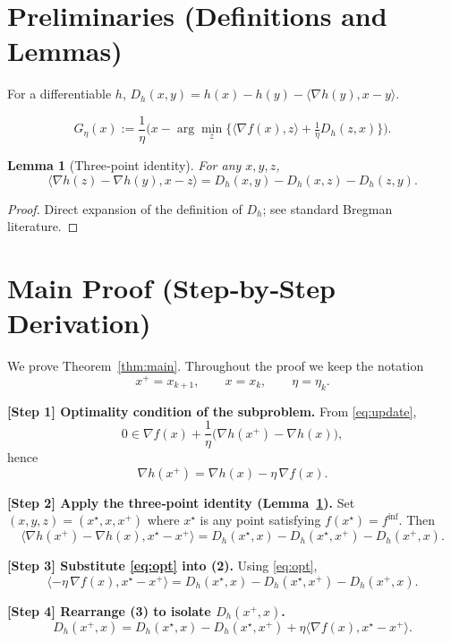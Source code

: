 \documentclass{article}
\newtheorem{lemma}{Lemma}
\newcommand{\inner}[2]{\langle #1,#2\rangle}
\begin{document}
\newpage
\section*{Preliminaries (Definitions and Lemmas)}
\begin{definition}
For a differentiable $h$, $D_{h}(x,y)=h(x)-h(y)-\inner{\nabla h(y)}{x-y}$.
\end{definition}
\begin{definition}
\[
G_{\eta}(x):=\frac{1}{\eta}\bigl(x-\arg\min_{z}\{\inner{\nabla f(x)}{z}+\tfrac{1}{\eta}D_{h}(z,x)\}\bigr).
\]
\end{definition}
\begin{lemma}[Three‑point identity]
\label{lem:3pt}
For any $x,y,z$,
\[
\inner{\nabla h(z)-\nabla h(y)}{x-z}=D_{h}(x,y)-D_{h}(x,z)-D_{h}(z,y).
\]
\end{lemma}
\begin{proof}
Direct expansion of the definition of $D_{h}$; see standard Bregman literature. \hfill\qedsymbol
\end{proof}

\section*{Main Proof (Step‑by‑Step Derivation)}
We prove Theorem~\ref{thm:main}.  Throughout the proof we keep the notation
\[
x^{+}=x_{k+1},\qquad x=x_{k},\qquad \eta=\eta_{k}.
\]

\bigskip
\noindent\textbf{[Step 1] Optimality condition of the subproblem.}  
From \eqref{eq:update},
\[
0\in \nabla f(x)+\frac{1}{\eta}\bigl(\nabla h(x^{+})-\nabla h(x)\bigr),
\]
hence
\begin{equation}
\label{eq:opt}
\nabla h(x^{+})=\nabla h(x)-\eta\,\nabla f(x).
\end{equation}

\noindent\textbf{[Step 2] Apply the three‑point identity (Lemma~\ref{lem:3pt}).}  
Set $(x,y,z)=(x^{\star},x,x^{+})$ where $x^{\star}$ is any point satisfying $f(x^{\star})=f^{\inf}$. Then
\[
\inner{\nabla h(x^{+})-\nabla h(x)}{x^{\star}-x^{+}}
= D_{h}(x^{\star},x)-D_{h}(x^{\star},x^{+})-D_{h}(x^{+},x).
\tag{2}
\]

\noindent\textbf{[Step 3] Substitute \eqref{eq:opt} into (2).}  
Using \eqref{eq:opt},
\[
\inner{-\eta\,\nabla f(x)}{x^{\star}-x^{+}}
= D_{h}(x^{\star},x)-D_{h}(x^{\star},x^{+})-D_{h}(x^{+},x).
\tag{3}
\]

\noindent\textbf{[Step 4] Rearrange (3) to isolate $D_{h}(x^{+},x)$.}  
\[
D_{h}(x^{+},x)= D_{h}(x^{\star},x)-D_{h}(x^{\star},x^{+})+\eta\inner{\nabla f(x)}{x^{\star}-x^{+}}.
\tag{4}
\]
\end{document}
